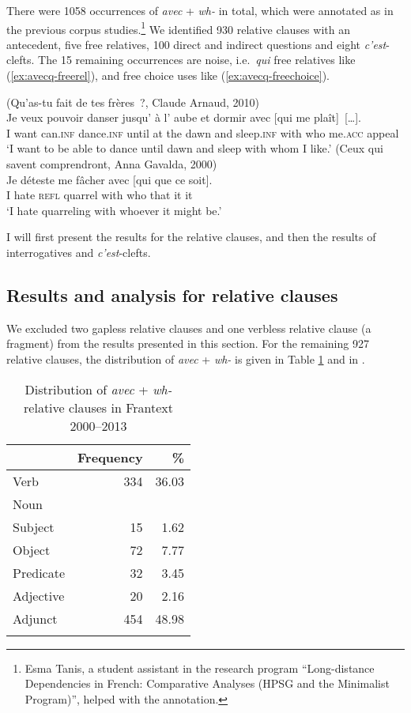 There were 1058 occurrences of \emph{avec} + \emph{wh-} in total, which were annotated as in the previous corpus studies.{\footnote{Esma Tanis, a student assistant in the research program ``Long-distance Dependencies in French: Comparative Analyses (HPSG and the Minimalist Program)'', helped with the annotation.}} We identified 930 relative clauses with an antecedent, five free relatives, 100 direct and indirect questions and eight \emph{c'est}-clefts. The 15 remaining occurrences are noise, i.e.\ \emph{qui} free relatives like (\ref{ex:avecq-freerel}), and free choice uses like (\ref{ex:avecq-freechoice}).

\eal
\ex (Qu'as-tu fait de tes frères~?, Claude Arnaud, 2010)\\
\gll Je veux pouvoir danser jusqu' à l' aube et dormir avec [qui me plaît]~[\dots].\\
I want can\textsc{.inf} dance\textsc{.inf} until at the dawn and sleep\textsc{.inf} with who me\textsc{.acc} appeal\\
\glt `I want to be able to dance until dawn and sleep with whom I like.'
\label{ex:avecq-freerel}
\ex (Ceux qui savent comprendront, Anna Gavalda, 2000)\\
\gll Je déteste me fâcher avec [qui que ce soit].\\
I hate \textsc{refl} quarrel with who that it it\\
\glt `I hate quarreling with whoever it might be.'
\label{ex:avecq-freechoice}
\zl 

I will first present the results for the relative clauses, and then the results of interrogatives and \emph{c'est}-clefts.

\subsection{Results and analysis for relative clauses}

We excluded two gapless relative clauses and one verbless relative clause (a fragment) from the results presented in this section. For the remaining 927 relative clauses, the distribution of \emph{avec} + \emph{wh-} is given in Table \ref{tab:avecq} and in .

\begin{table}
    \begin{tabular}{lrr}
         \lsptoprule
              & Frequency & \% \\\midrule
         Verb & 334 & 36.03 \\
         Noun & & \\
         \quad Subject & 15 & 1.62 \\
         \quad Object & 72 & 7.77 \\
         \quad Predicate & 32 & 3.45 \\
         Adjective & 20 & 2.16 \\
         Adjunct & 454 & 48.98 \\
         \lspbottomrule
    \end{tabular}
    \caption{Distribution of \emph{avec} + \emph{wh-} relative clauses in Frantext 2000--2013}
    \label{tab:avecq}
\end{table}


